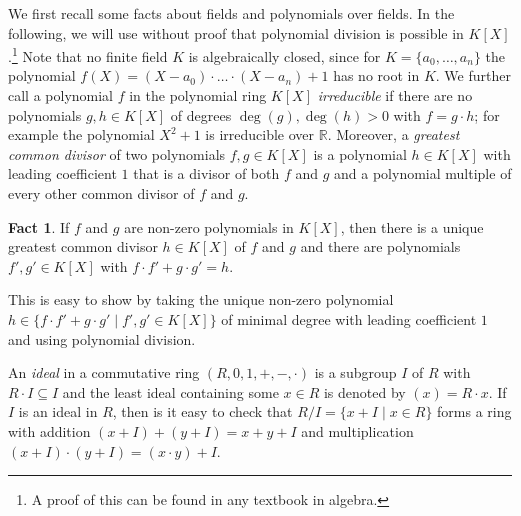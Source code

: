 \documentclass[10pt]{amsart}
\newcommand{\RR}{\mathbb{R}}
\theoremstyle{definition}
\newtheorem{fact}[theorem]{Fact}
\theoremstyle{remark}
\begin{document}
We first recall some facts about fields and polynomials over fields. In the following, we will use without proof that polynomial division is possible in $K[X]$.\footnote{A proof of this can be found in any textbook in algebra.} Note that no finite field $K$ is algebraically closed, since for  $K=\{a_0,\dots,a_n\}$ the polynomial $f(X)=(X-a_0)\cdot \dots \cdot(X-a_n)+1$ has no root in $K$. We further call a polynomial $f$ in the polynomial ring $K[X]$ \emph{irreducible} if there are no polynomials $g,h\in K[X]$ of degrees $\deg(g),\deg(h)>0$ with $f= g\cdot h$; for example the polynomial $X^2+1$ is irreducible over $\RR$. Moreover, a \emph{greatest common divisor} of two polynomials $f,g\in K[X]$ is a polynomial $h\in K[X]$ with leading coefficient $1$ that is a divisor of both $f$ and $g$ and a polynomial multiple of every other common divisor of $f$ and $g$. 

\begin{fact} 
If $f$ and $g$ are non-zero polynomials in $K[X]$, then there is a unique greatest common divisor $h\in K[X]$ of $f$ and $g$ and there are polynomials $f',g'\in K[X]$ with $f\cdot f'+ g\cdot g'= h$. 
\end{fact} 

 This is easy to show by taking the unique non-zero polynomial $h\in \{f\cdot f'+ g\cdot g'\mid f',g'\in K[X]\}$ of minimal degree with leading coefficient $1$ and using polynomial division. 

An \emph{ideal} in a commutative ring $(R,0,1,+,-,\cdot)$ is a subgroup $I$ of $R$ with $R\cdot I\subseteq I$ and the least ideal containing some $x\in R$ is denoted by $(x)=R\cdot x$. If $I$ is an ideal in $R$, then is it easy to check that $R/I=\{x+I\mid x\in R\}$ forms a ring with addition $(x+I)+(y+I)=x+y+I$ and multiplication $(x+I)\cdot(y+I)=(x\cdot y)+I$. 
\end{document}
